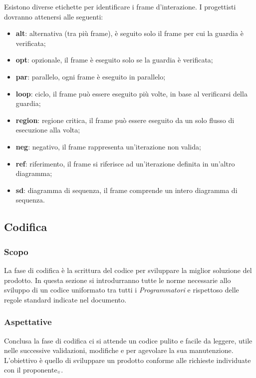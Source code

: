 Esistono diverse etichette per identificare i frame d'interazione. I progettisti dovranno attenersi alle seguenti:
\begin{itemize}
	\item \textbf{alt}: alternativa (tra più frame), è seguito solo il frame per cui la guardia è verificata;
	\item \textbf{opt}: opzionale, il frame è eseguito solo se la guardia è verificata;
	\item \textbf{par}: parallelo, ogni frame è eseguito in parallelo;
	\item \textbf{loop}: ciclo, il frame può essere eseguito più volte, in base al verificarsi della guardia;
	\item \textbf{region}: regione critica, il frame può essere eseguito da un solo flusso di esecuzione alla volta;
	\item \textbf{neg}: negativo, il frame rappresenta un'iterazione non valida;
	\item \textbf{ref}: riferimento, il frame si riferisce ad un'iterazione definita in un'altro diagramma;
	\item \textbf{sd}: diagramma di sequenza, il frame comprende un intero diagramma di sequenza.
\end{itemize}
\subsection{Codifica}\label{ProcessiPrimariCodifica}

\subsubsection{Scopo}\label{ProcessiPrimariCodificaScopo}
La fase di codifica è la scrittura del codice per sviluppare la miglior soluzione del prodotto. In questa sezione si introdurranno tutte le norme necessarie allo sviluppo di un codice uniformato tra tutti i \textit{Programmatori} e rispettoso delle regole standard indicate nel documento.
\subsubsection{Aspettative}\label{ProcessiPrimariCodificaAspettative}
Conclusa la fase di codifica ci si attende un codice pulito e facile da leggere, utile nelle successive validazioni, modifiche e per agevolare la sua manutenzione. L'obiettivo è quello di sviluppare un prodotto conforme alle richieste individuate con il proponente$_{\scaleto{G}{3pt}}$.

